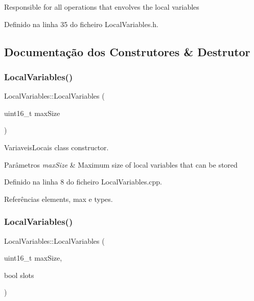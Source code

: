 Responsible for all operations that envolves the local variables 

Definido na linha 35 do ficheiro Local\+Variables.\+h.



\subsection{Documentação dos Construtores \& Destrutor}
\mbox{\label{classLocalVariables_ae354d02f996f4f584fe857d9304161c1}} 
\subsubsection{\texorpdfstring{Local\+Variables()}{LocalVariables()}\hspace{0.1cm}{\footnotesize\ttfamily [1/2]}}
{\footnotesize\ttfamily Local\+Variables\+::\+Local\+Variables (\begin{DoxyParamCaption}\item[{uint16\+\_\+t}]{max\+Size }\end{DoxyParamCaption})}



Variaveis\+Locais class constructor. 


\begin{DoxyParams}{Parâmetros}
{\em max\+Size} & Maximum size of local variables that can be stored \\
\hline
\end{DoxyParams}


Definido na linha 8 do ficheiro Local\+Variables.\+cpp.



Referências elements, max e types.

\mbox{\label{classLocalVariables_a2c9e8aefc8aa8ff0d0efd305ab3e424b}} 
\subsubsection{\texorpdfstring{Local\+Variables()}{LocalVariables()}\hspace{0.1cm}{\footnotesize\ttfamily [2/2]}}
{\footnotesize\ttfamily Local\+Variables\+::\+Local\+Variables (\begin{DoxyParamCaption}\item[{uint16\+\_\+t}]{max\+Size,  }\item[{bool}]{slots }\end{DoxyParamCaption})}



